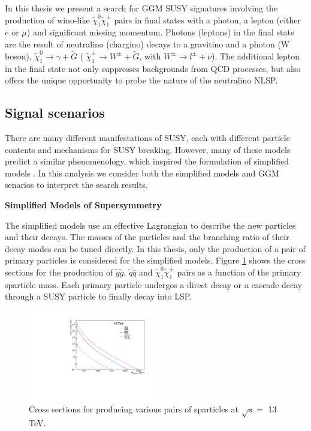 \documentclass[thesis.tex]{subfiles}
\begin{document}
In this thesis we present a search for GGM SUSY signatures involving the production of wino-like $\tilde{\chi}_1^0\tilde{\chi}_1^\pm$ pairs in final states with a photon, a lepton (either $e$ or $\mu$) and significant missing momentum. 
Photons (leptons) in the final state are the result of neutralino (chargino) decays to a gravitino and a photon (W boson), $\tilde{\chi}_1^0 \rightarrow \gamma + \tilde{G}$ ( $\tilde{\chi}_1^\pm \rightarrow W^\pm+ \tilde{G}$, with $W^\pm \rightarrow l^\pm + \nu$).
The additional lepton in the final state not only suppresses backgrounds from QCD processes, but also offers the unique opportunity to probe the nature of the neutralino NLSP.  

\subsection{Signal scenarios}
There are many different manifestations of SUSY, each with different particle contents and mechanisms for SUSY breaking. 
However, many of these models predict a similar phenomenology, which inspired the formulation of simplified models \cite{SimplifiedModel}.
In this analysis we consider both the simplified models and GGM senarios to interpret the search results. 

\noindent \textbf{Simplified Models of Supersymmetry}

The simplified models use an effective Lagrangian to describe the new particles and their decays. 
The masses of the particles and the branching ratio of their decay modes can be tuned directly. 
In this thesis, only the production of a pair of primary particles is considered for the simplified models. 
Figure \ref{fig:crosssection} shows the cross sections for the production of $\tilde{g}\tilde{g}$, $\tilde{q}\tilde{\bar{q}}$ and $\tilde{\chi}_1^0\tilde{\chi}_1^\pm$ pairs as a function of the primary sparticle mass. 
Each primary particle undergos a direct decay or a cascade decay through a SUSY particle to finally decay into LSP. 

	\begin{figure}[!h]
		\centering
		\includegraphics[width=0.5\textwidth]{Fig/xs_thesis.pdf}
		\caption{Cross sections for producing various pairs of sparticles at $\sqrt{s} =$ 13 TeV.} 
		\label{fig:crosssection}
	\end{figure}
\end{document}
